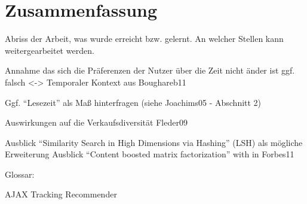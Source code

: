 
\section{Zusammenfassung}

	Abriss der Arbeit, was wurde erreicht bzw. gelernt. An welcher Stellen kann weitergearbeitet werden. 


Annahme das sich die Präferenzen der Nutzer über die Zeit nicht änder ist ggf. falsch <-> Temporaler Kontext aus Boughareb11 

Ggf. ``Lesezeit'' als Maß hinterfragen (siehe Joachims05 - Abschnitt 2)

Auswirkungen auf die Verkaufsdiversität Fleder09

Ausblick ``Similarity Search in High Dimensions via Hashing'' (LSH) als mögliche Erweiterung
Ausblick ``Content boosted matrix factorization'' with in Forbes11



Glossar:

AJAX
Tracking
Recommender